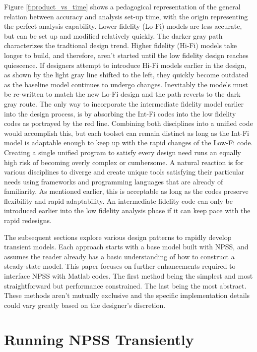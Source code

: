 \documentclass[heading.tex]{subfiles}
\begin{document}
Figure \ref{f:product_vs_time} shows a pedagogical representation of the general relation between
accuracy and analysis set-up time, with the origin representing the perfect analysis capability.
Lower fidelity (Lo-Fi) models are less accurate, but can be set
up and modified relatively quickly. The darker gray path characterizes the tradtional design
trend. Higher fidelity (Hi-Fi) models take longer to build, and therefore, aren't started until
the low fidelity design reaches quiescence. If designers attempt to introduce Hi-Fi models earlier in
the design, as shown by the light gray line shifted to the left, they quickly become outdated as
the baseline model continues to undergo changes. Inevitably the models must be re-written to match
the new Lo-Fi design and the path reverts to the dark gray route. The only way to incorporate the
intermediate fidelity model earlier into the design process, is by absorbing the Int-Fi codes into
the low fidelity codes as portrayed by the red line. Combining both disciplines into a unified code
would accomplish this, but each toolset can remain distinct as long as the Int-Fi model is
adaptable enough to keep up with the rapid changes of the Low-Fi code.
Creating a single unified program to satisfy every design need runs an equally high risk
of becoming overly complex or cumbersome. 
A natural reaction is for various
disciplines to diverge and create unique tools satisfying their particular needs using frameworks
and programming languages that are already of familiarity. As mentioned earlier, this is
acceptable as long as the codes preserve flexibility and rapid adaptability. An intermediate
fidelity code can only be introduced earlier into the low fidelity analysis phase if it can keep
pace with the rapid redesigns.

The subsequent sections explore various design patterns to rapidly develop transient models. Each
approach starts with a base model built with NPSS, and assumes the reader already has a basic
understanding of how to construct a steady-state model. This paper focuses on further enhancements
required to interface NPSS with Matlab codes. The first method being the simplest and most
straightforward but performance constrained. The last being the most abstract. These methods
aren't mutually exclusive and the specific implementation details could vary greatly based on the
designer's discretion. 


\section{Running NPSS Transiently}
\end{document}
